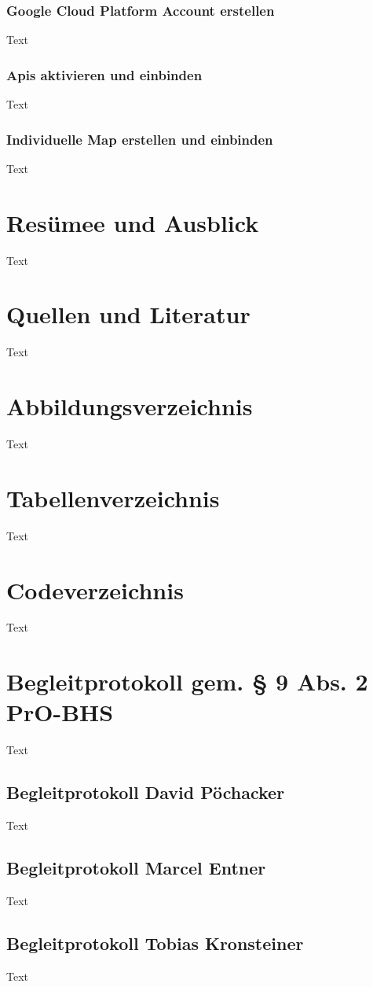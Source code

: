\subsection{Google Cloud Platform Account erstellen}
Text

\subsection{Apis aktivieren und einbinden}
Text

\subsection{Individuelle Map erstellen und einbinden}
Text



\chapter{Resümee und Ausblick}
Text


\chapter{Quellen und Literatur}
Text

\chapter{Abbildungsverzeichnis}
Text
\chapter{Tabellenverzeichnis}
Text
\chapter{Codeverzeichnis}
Text


\chapter{Begleitprotokoll gem. § 9 Abs. 2 PrO-BHS}
Text
\section{Begleitprotokoll David Pöchacker}
Text
\section{Begleitprotokoll Marcel Entner}
Text
\section{Begleitprotokoll Tobias Kronsteiner}
Text



